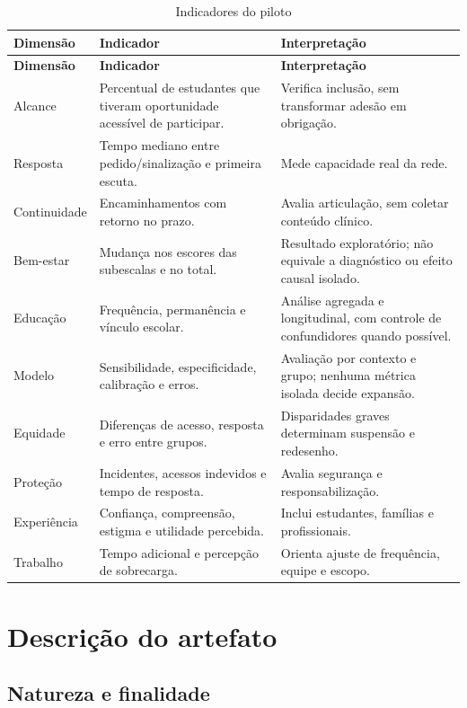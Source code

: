 \documentclass[
  12pt,
  openright,
  oneside,
  a4paper,
  english,
  brazil
]{abntex2}
\begin{document}
\begin{longtable}{p{2.5cm}p{5cm}p{5cm}}
\caption{Indicadores do piloto}\label{tab:indicadores}\\
\toprule
\textbf{Dimensão} & \textbf{Indicador} & \textbf{Interpretação} \\
\midrule
\endfirsthead
\toprule
\textbf{Dimensão} & \textbf{Indicador} & \textbf{Interpretação} \\
\midrule
\endhead
Alcance & Percentual de estudantes que tiveram oportunidade acessível de participar. & Verifica inclusão, sem transformar adesão em obrigação. \\
Resposta & Tempo mediano entre pedido/sinalização e primeira escuta. & Mede capacidade real da rede. \\
Continuidade & Encaminhamentos com retorno no prazo. & Avalia articulação, sem coletar conteúdo clínico. \\
Bem-estar & Mudança nos escores das subescalas e no total. & Resultado exploratório; não equivale a diagnóstico ou efeito causal isolado. \\
Educação & Frequência, permanência e vínculo escolar. & Análise agregada e longitudinal, com controle de confundidores quando possível. \\
Modelo & Sensibilidade, especificidade, calibração e erros. & Avaliação por contexto e grupo; nenhuma métrica isolada decide expansão. \\
Equidade & Diferenças de acesso, resposta e erro entre grupos. & Disparidades graves determinam suspensão e redesenho. \\
Proteção & Incidentes, acessos indevidos e tempo de resposta. & Avalia segurança e responsabilização. \\
Experiência & Confiança, compreensão, estigma e utilidade percebida. & Inclui estudantes, famílias e profissionais. \\
Trabalho & Tempo adicional e percepção de sobrecarga. & Orienta ajuste de frequência, equipe e escopo. \\
\bottomrule
\end{longtable}

\chapter{Descrição do artefato}

\section{Natureza e finalidade}
\end{document}
